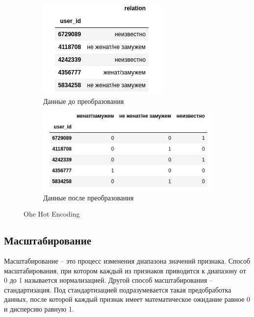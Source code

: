 \begin{figure}[h]
\begin{subfigure}[h]{0.4\linewidth}
\includegraphics[width=\linewidth]{images/ohe_example1.png}
\caption{Данные до преобразования}
\end{subfigure}
\hfill
\begin{subfigure}[h]{0.6\linewidth}
\includegraphics[width=\linewidth]{images/ohe_example2.png}
\caption{Данные после преобразования}
\end{subfigure}%
\caption{Ohe Hot Encoding}
\label{fig:ohe_example}
\end{figure}

\subsection*{Масштабирование}

Масштабирование -- это процесс изменения диапазона значений признака. Способ масштабирования, при котором каждый из признаков приводится к диапазону от 0 до 1 называется нормализацией. Другой способ масштабирования -- стандартизация. Под стандартизацией подразумевается такая предобработка данных, после которой каждый признак имеет математическое ожидание равное 0 и дисперсию равную 1.

